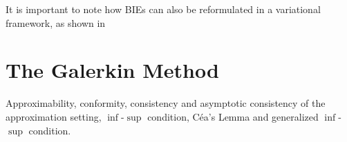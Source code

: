 It is important to note how \glspl{BIE} can also be reformulated in a
variational framework, as shown in 

\section{The Galerkin Method}

Approximability, conformity, consistency and asymptotic consistency
of the approximation setting, $\inf$-$\sup$ condition, Céa's Lemma
and generalized $\inf$-$\sup$ condition.~\autocite{Ern2004-oo}

